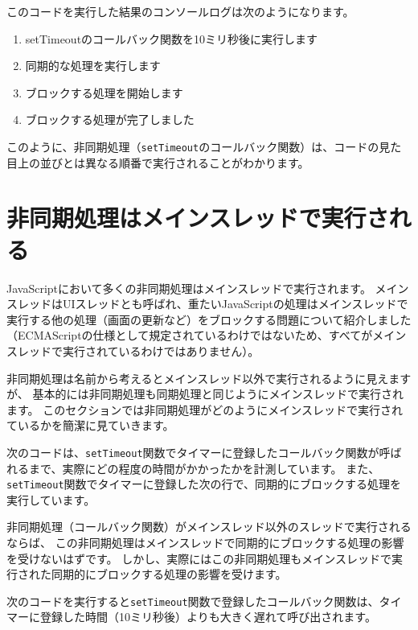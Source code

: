 このコードを実行した結果のコンソールログは次のようになります。

\begin{enumerate}
\def\labelenumi{\arabic{enumi}.}
\item
  setTimeoutのコールバック関数を10ミリ秒後に実行します
\item
  同期的な処理を実行します
\item
  ブロックする処理を開始します
\item
  ブロックする処理が完了しました
\end{enumerate}

このように、非同期処理（\texttt{setTimeout}のコールバック関数）は、コードの見た目上の並びとは異なる順番で実行されることがわかります。

\hypertarget{async-and-main-thread}{%
\section{非同期処理はメインスレッドで実行される}\label{async-and-main-thread}}

JavaScriptにおいて多くの非同期処理はメインスレッドで実行されます。
メインスレッドはUIスレッドとも呼ばれ、重たいJavaScriptの処理はメインスレッドで実行する他の処理（画面の更新など）をブロックする問題について紹介しました（ECMAScriptの仕様として規定されているわけではないため、すべてがメインスレッドで実行されているわけではありません）。

非同期処理は名前から考えるとメインスレッド以外で実行されるように見えますが、
基本的には非同期処理も同期処理と同じようにメインスレッドで実行されます。
このセクションでは非同期処理がどのようにメインスレッドで実行されているかを簡潔に見ていきます。

次のコードは、\texttt{setTimeout}関数でタイマーに登録したコールバック関数が呼ばれるまで、実際にどの程度の時間がかかったかを計測しています。
また、\texttt{setTimeout}関数でタイマーに登録した次の行で、同期的にブロックする処理を実行しています。

非同期処理（コールバック関数）がメインスレッド以外のスレッドで実行されるならば、
この非同期処理はメインスレッドで同期的にブロックする処理の影響を受けないはずです。
しかし、実際にはこの非同期処理もメインスレッドで実行された同期的にブロックする処理の影響を受けます。

次のコードを実行すると\texttt{setTimeout}関数で登録したコールバック関数は、タイマーに登録した時間（10ミリ秒後）よりも大きく遅れて呼び出されます。

